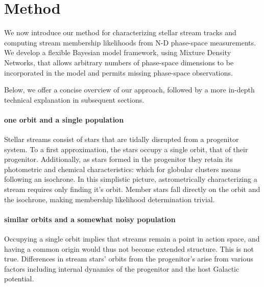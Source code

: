\documentclass[twocolumn]{aastex631}
\begin{document}

\section{Method} \label{sec:method}

    We now introduce our method for characterizing stellar stream tracks and computing stream membership likelihoods from N-D phase-space measurements.
    We develop a flexible Bayesian model framework, using Mixture Density Networks, that allows arbitrary numbers of phase-space dimensions to be incorporated in the model and permits missing phase-space observations.


        Below, we offer a concise overview of our approach, followed by a more in-depth technical explanation in subsequent sections.

        \paragraph{one orbit and a single population}

            Stellar streams consist of stars that are tidally disrupted from a progenitor system.
            To a first approximation, the stars occupy a single orbit, that of their progenitor.
            Additionally, as stars formed in the progenitor they retain its photometric and chemical characteristics: which for globular clusters means following an isochrone.
            In this simplistic picture, astrometrically characterizing a stream requires only finding it's orbit. Member stars fall directly on the orbit and the isochrone, making membership likelihood determination trivial.


        \paragraph{similar orbits and a somewhat noisy population}

            Occupying a single orbit implies that streams remain a point in action space, and having a common origin would thus not become extended structure. This is not true.
            Differences in stream stars' orbits from the progenitor's arise from various factors including internal dynamics of the progenitor and the host Galactic potential.
\end{document}
